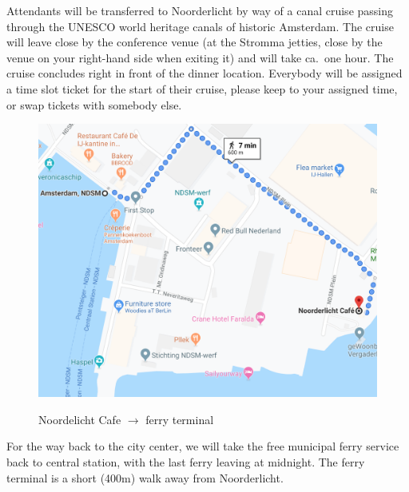 Attendants will be transferred to Noorderlicht by way of a canal cruise passing through the UNESCO world heritage canals of historic Amsterdam. The cruise will leave close by the conference venue (at the Stromma jetties, close by the venue on your right-hand side when exiting it) and will take ca.\ one hour. The cruise concludes right in front of the dinner location. Everybody will be assigned a time slot ticket for the start of their cruise, please keep to your assigned time, or swap tickets with somebody else.

\begin{figure}[h]
\centering
\includegraphics[width=.7\textwidth]{images/noorderlicht-ndsmferry.png}

Noordelicht Cafe $\rightarrow$ ferry terminal
\end{figure}


For the way back to the city center, we will take the free municipal ferry service back to central station, with the last ferry leaving at midnight. The ferry terminal is a short (400m) walk away from Noorderlicht.
